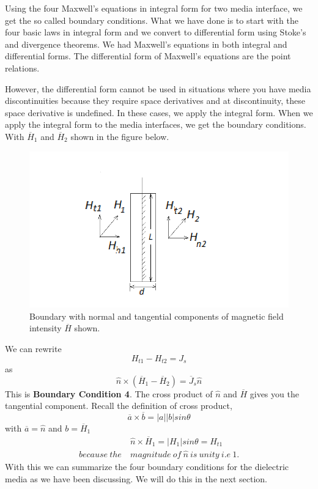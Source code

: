 Using the four Maxwell's equations in integral form for two media interface, we get the so called boundary conditions. What we have done is to start with the four basic laws in integral form and we convert to differential form using Stoke's and divergence theorems. We had Maxwell's equations in both integral and differential forms. The differential form of Maxwell's equations are the point relations.

However, the differential form cannot be used in situations where you have media discontinuities because they require space derivatives and at discontinuity, these space derivative is undefined. In these cases, we apply the integral form. When we apply the integral form to the media interfaces, we get the boundary conditions. With $\overline{H}_1$ and $\overline{H}_2$ shown in the figure below.
\begin{figure}[h]
\centering
\includegraphics[width=1\linewidth]{./graphics/diemedium4_2_2}
\caption{Boundary with normal and tangential components of magnetic field intensity $\overline{H}$ shown.}
\end{figure}

We can rewrite 
\begin{equation*}
H_{t1} - H_{t2} = J_s
\end{equation*}
as
\begin{equation}
\hat{n} \times (\overline{H}_1 - \overline{H}_2) = \overline{J}_s\hat{n}
\end{equation}
This is \textbf{Boundary Condition 4}. The cross product of $\hat{n}$ and $\overline{H}$ gives you the tangential component. Recall the definition of cross product,
\begin{equation*}
\overline{a}\times\overline{b} = \left|a \right| \left|b \right|sin\theta 
\end{equation*}
with $\overline{a} = \hat{n}$ and $ b = \overline{H}_1$
\begin{align*}
&\hat{n}\times\overline{H}_1 = \left|H_1 \right|sin\theta = H_{t1} \\ because\ the\ & magnitude\ of\ \hat{n}\ is\ unity\ i.e\ 1.
\end{align*}
With this we can summarize the four boundary conditions for the dielectric media as we have been discussing. We will do this in the next section.
